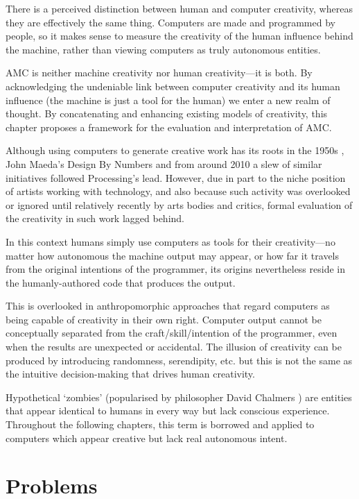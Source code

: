 There is a perceived distinction between human and computer creativity, whereas they are effectively the same thing. Computers are made and programmed by people, so it makes sense to measure the creativity of the human influence behind the machine, rather than viewing computers as truly autonomous entities.

\ac{AMC} is neither machine creativity nor human creativity---it is both. By acknowledging the undeniable link between computer creativity and its human influence (the machine is just a tool for the human) we enter a new realm of thought. By concatenating and enhancing existing models of creativity, this chapter proposes a framework for the evaluation and interpretation of \ac{AMC}.

\spirals

Although using computers to generate creative work has its roots in the 1950s \autocite{Candy2011, Copeland2016}, John Maeda's Design By Numbers \autocite*{Maeda2001} and from around 2010 a slew of similar initiatives followed Processing's lead. However, due in part to the niche position of artists working with technology, and also because such activity was overlooked or ignored until relatively recently by arts bodies and critics, formal evaluation of the creativity in such work lagged behind.

In this context humans simply use computers as tools for their creativity---no matter how autonomous the machine output may appear, or how far it travels from the original intentions of the programmer, its origins nevertheless reside in the humanly-authored code that produces the output.

This is overlooked in anthropomorphic approaches that regard computers as being capable of creativity in their own right. Computer output cannot be conceptually separated from the craft/skill/intention of the programmer, even when the results are unexpected or accidental. The illusion of creativity can be produced by introducing randomness, serendipity, etc. but this is not the same as the intuitive decision-making that drives human creativity.

Hypothetical `zombies' (popularised by philosopher David Chalmers \autocite*{Chalmers1996}) are entities that appear identical to humans in every way but lack conscious experience. Throughout the following chapters, this term is borrowed and applied to computers which appear creative but lack real autonomous intent.


\section{Problems}

